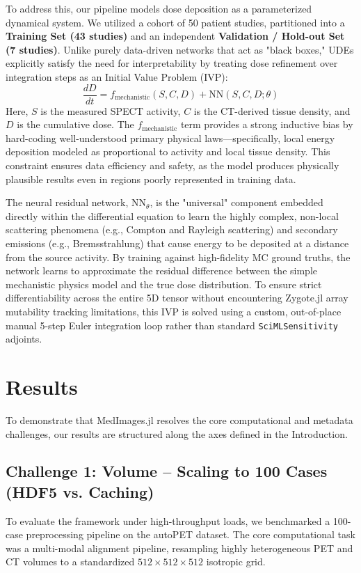 \documentclass[10pt,letterpaper]{article}
\begin{document}
To address this, our pipeline models dose deposition as a parameterized dynamical system. We utilized a cohort of 50 patient studies, partitioned into a \textbf{Training Set (43 studies)} and an independent \textbf{Validation / Hold-out Set (7 studies)}. Unlike purely data-driven networks that act as "black boxes," UDEs explicitly satisfy the need for interpretability by treating dose refinement over integration steps as an Initial Value Problem (IVP):
\begin{equation}
\frac{dD}{dt} = f_{\text{mechanistic}}(S, C, D) + \text{NN}(S, C, D; \theta)
\end{equation}
Here, $S$ is the measured SPECT activity, $C$ is the CT-derived tissue density, and $D$ is the cumulative dose. The $f_{\text{mechanistic}}$ term provides a strong inductive bias by hard-coding well-understood primary physical laws—specifically, local energy deposition modeled as proportional to activity and local tissue density. This constraint ensures data efficiency and safety, as the model produces physically plausible results even in regions poorly represented in training data. 

The neural residual network, $\text{NN}_{\theta}$, is the "universal" component embedded directly within the differential equation to learn the highly complex, non-local scattering phenomena (e.g., Compton and Rayleigh scattering) and secondary emissions (e.g., Bremsstrahlung) that cause energy to be deposited at a distance from the source activity. By training against high-fidelity MC ground truths, the network learns to approximate the residual difference between the simple mechanistic physics model and the true dose distribution. To ensure strict differentiability across the entire 5D tensor without encountering Zygote.jl array mutability tracking limitations, this IVP is solved using a custom, out-of-place manual 5-step Euler integration loop rather than standard \texttt{SciMLSensitivity} adjoints.


\section{Results}
To demonstrate that MedImages.jl resolves the core computational and metadata challenges, our results are structured along the axes defined in the Introduction.

\subsection*{Challenge 1: Volume -- Scaling to 100 Cases (HDF5 vs. Caching)}
To evaluate the framework under high-throughput loads, we benchmarked a 100-case preprocessing pipeline on the autoPET dataset. The core computational task was a multi-modal alignment pipeline, resampling highly heterogeneous PET and CT volumes to a standardized $512 \times 512 \times 512$ isotropic grid. 
\end{document}
